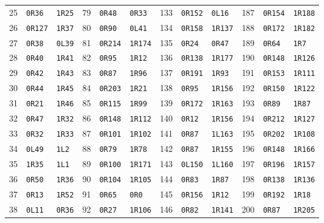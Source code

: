 \begin{longtable}{@{}rll@{\qquad}rll@{\qquad}rll@{\qquad}rll@{}}
25 & \texttt{0R36} & \texttt{1R25} & 79 & \texttt{0R48} & \texttt{0R33} & 133 & \texttt{0R152} & \texttt{0L16} & 187 & \texttt{0R154} & \texttt{1R188}\\
26 & \texttt{0R127} & \texttt{1R37} & 80 & \texttt{0R90} & \texttt{0L41} & 134 & \texttt{0R158} & \texttt{1R137} & 188 & \texttt{0R172} & \texttt{1R182}\\
27 & \texttt{0R38} & \texttt{0L39} & 81 & \texttt{0R214} & \texttt{1R174} & 135 & \texttt{0R24} & \texttt{0R47} & 189 & \texttt{0R64} & \texttt{1R7}\\
28 & \texttt{0R40} & \texttt{1R41} & 82 & \texttt{0R95} & \texttt{1R12} & 136 & \texttt{0R138} & \texttt{1R177} & 190 & \texttt{0R148} & \texttt{1R126}\\
29 & \texttt{0R42} & \texttt{1R43} & 83 & \texttt{0R87} & \texttt{1R96} & 137 & \texttt{0R191} & \texttt{1R93} & 191 & \texttt{0R153} & \texttt{1R111}\\
30 & \texttt{0R44} & \texttt{1R45} & 84 & \texttt{0R203} & \texttt{1R21} & 138 & \texttt{0R95} & \texttt{1R156} & 192 & \texttt{0R150} & \texttt{1R122}\\
31 & \texttt{0R21} & \texttt{1R46} & 85 & \texttt{0R115} & \texttt{1R99} & 139 & \texttt{0R172} & \texttt{1R163} & 193 & \texttt{0R89} & \texttt{1R87}\\
32 & \texttt{0R47} & \texttt{1R32} & 86 & \texttt{0R148} & \texttt{1R112} & 140 & \texttt{0R12} & \texttt{1R156} & 194 & \texttt{0R212} & \texttt{1R127}\\
33 & \texttt{0R32} & \texttt{1R33} & 87 & \texttt{0R101} & \texttt{1R102} & 141 & \texttt{0R87} & \texttt{1L163} & 195 & \texttt{0R202} & \texttt{1R108}\\
34 & \texttt{0L49} & \texttt{1L2} & 88 & \texttt{0R79} & \texttt{1R78} & 142 & \texttt{0R87} & \texttt{1R155} & 196 & \texttt{0R148} & \texttt{1R166}\\
35 & \texttt{1R35} & \texttt{1L1} & 89 & \texttt{0R100} & \texttt{1R171} & 143 & \texttt{0L150} & \texttt{1L160} & 197 & \texttt{0R196} & \texttt{1R157}\\
36 & \texttt{0R50} & \texttt{1R36} & 90 & \texttt{0R104} & \texttt{1R105} & 144 & \texttt{0R83} & \texttt{1R87} & 198 & \texttt{0R138} & \texttt{1R136}\\
37 & \texttt{0R13} & \texttt{1R52} & 91 & \texttt{0R65} & \texttt{0R0} & 145 & \texttt{0R156} & \texttt{1R12} & 199 & \texttt{0R192} & \texttt{1R18}\\
38 & \texttt{0L11} & \texttt{0R36} & 92 & \texttt{0R27} & \texttt{1R106} & 146 & \texttt{0R82} & \texttt{1R141} & 200 & \texttt{0R87} & \texttt{1R205}\\

\end{longtable}
